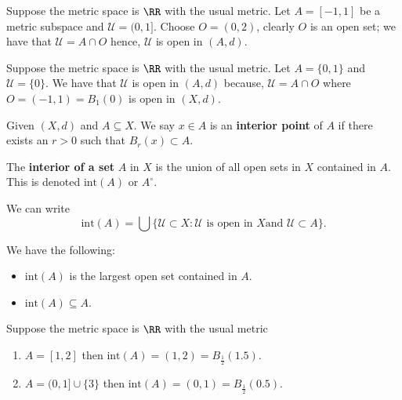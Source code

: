 \documentclass[12pt, a4paper]{article}
\begin{document}
\begin{mdexample}
    Suppose the metric space is \(\RR\) with the usual metric. Let \(A = [-1,1]\) be a metric subspace and \(\mathcal{U} = (0,1]\). Choose \(O=(0,2)\), clearly \(O\) is an open set; we have that \(\mathcal{U} =A \cap O\) hence, \(\mathcal{U}\) is open in \((A,d)\).
\end{mdexample}

\begin{example}
    Suppose the metric space is \(\RR\) with the usual metric. Let \(A =\{0,1\}\) and \(\mathcal{U} = \{0\}\). We have that \(\mathcal{U}\) is open in \((A,d)\) because, \(\mathcal{U} = A \cap O\) where \(O=(-1,1)=B_1(0)\) is open in \((X,d)\).
\end{example}

\begin{definition}
    Given \((X,d)\) and \(A \subseteq X\). We say \(x \in A\) is an \textbf{interior point} of \(A\) if there exists an \(r>0\) such that \(B_r(x) \subset A\).
\end{definition}

\begin{definition}
    The \textbf{interior of a set} \(A\) in \(X\) is the union of all open sets in \(X\) contained in \(A\). This is denoted \(\text{int}(A)\) or \(A^{\circ}\).
\end{definition}

\begin{theorem}
    We can write 
    \[\text{int}(A) = \bigcup \{\mathcal{U} \subset X : \mathcal{U} \text{ is open in } X \text{and } \mathcal{U} \subset A\}.\]
\end{theorem}

\begin{mdremark}
    We have the following:
    \begin{itemize}
        \item \(\text{int}(A)\) is the largest open set contained in \(A\). 
        \item \(\text{int}(A) \subseteq A\).
    \end{itemize}
\end{mdremark}

\begin{example}
    Suppose the metric space is \(\RR\) with the usual metric 
    \begin{enumerate}
        \item \(A = [1,2]\) then \(\text{int}(A)=(1,2) = B_{\frac{1}{2}}(1.5)\).
        \item \(A=(0,1] \cup \{3\}\) then \(\text{int}(A)=(0,1)=B_{\frac{1}{2}}(0.5)\).
    \end{enumerate}
\end{example}
\end{document}
